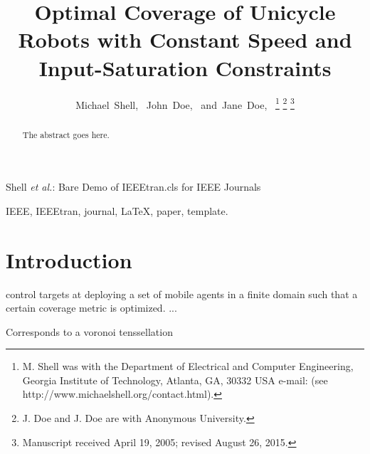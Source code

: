 \documentclass[journal]{IEEEtran}
\begin{document}
	
\title{Optimal Coverage of Unicycle Robots with Constant Speed and Input-Saturation Constraints}

\author{Michael~Shell,~
        John~Doe,~
        and~Jane~Doe,~%
\thanks{M. Shell was with the Department
of Electrical and Computer Engineering, Georgia Institute of Technology, Atlanta,
GA, 30332 USA e-mail: (see http://www.michaelshell.org/contact.html).}%
\thanks{J. Doe and J. Doe are with Anonymous University.}%
\thanks{Manuscript received April 19, 2005; revised August 26, 2015.}}

%
{Shell \MakeLowercase{\textit{et al.}}: Bare Demo of IEEEtran.cls for IEEE Journals}

\maketitle

\begin{abstract}
The abstract goes here.
\end{abstract}

\begin{IEEEkeywords}
IEEE, IEEEtran, journal, \LaTeX, paper, template.
\end{IEEEkeywords}

\IEEEpeerreviewmaketitle


\section{Introduction}

 control targets at deploying a set of mobile agents in a finite domain such that a certain coverage metric is optimized. ...


Corresponds to a voronoi tenssellation
\end{document}

